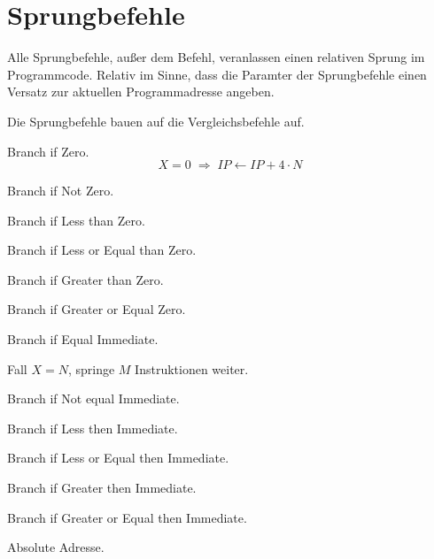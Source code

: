 \section{Sprungbefehle}
\label{sec:Sprungbefehle}

Alle Sprungbefehle, außer dem  Befehl, veranlassen einen 
relativen Sprung im Programmcode. Relativ im Sinne, dass die Paramter der
Sprungbefehle einen Versatz zur aktuellen Programmadresse angeben.

Die Sprungbefehle bauen auf die Vergleichsbefehle auf.

\glqq Branch if Zero\grqq.
\[
    X = 0 \; \Rightarrow \;
    IP \gets IP + 4 \cdot N
\]


\glqq Branch if Not Zero\grqq.



\glqq Branch if Less than Zero\grqq.



\glqq Branch if Less or Equal than Zero\grqq.


\glqq Branch if Greater than Zero\grqq.


\glqq Branch if Greater or Equal Zero\grqq.




\glqq Branch if Equal Immediate\grqq.

Fall $X = N$, springe $M$ Instruktionen weiter.



\glqq Branch if Not equal Immediate\grqq.


\glqq Branch if Less then Immediate\grqq.



\glqq Branch if Less or Equal then Immediate\grqq.


\glqq Branch if Greater then Immediate\grqq.

\glqq Branch if Greater or Equal then Immediate\grqq.







Absolute Adresse.



